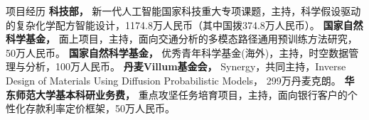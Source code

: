 \begin{rubric}{项目经历}
\entry*[2026.08 -- 2028.08]%
	\textbf{科技部，} 新一代人工智能国家科技重大专项课题，主持，科学假设驱动的复杂化学配方智能设计，1174.8万人民币（其中国拨374.8万人民币）。
\entry*[2025 -- 2028]%
	\textbf{国家自然科学基金，} 面上项目，主持，面向交通分析的多模态路径通用预训练方法研究， 50万人民币。
\entry*[2023 -- 2026]%
    \textbf{国家自然科学基金，} 优秀青年科学基金(海外)，主持，时空数据管理与分析，100万人民币。
\entry*[2024 -- 2026]%
	\textbf{丹麦Villum基金会，} Synergy，共同主持，Inverse Design of Materials Using Diffusion Probabilistic Models， 299万丹麦克朗。
\entry*[2023 -- 2026]%
	\textbf{华东师范大学基本科研业务费，} 重点攻坚任务培育项目，主持，面向银行客户的个性化存款利率定价框架，50万人民币。
\end{rubric}
